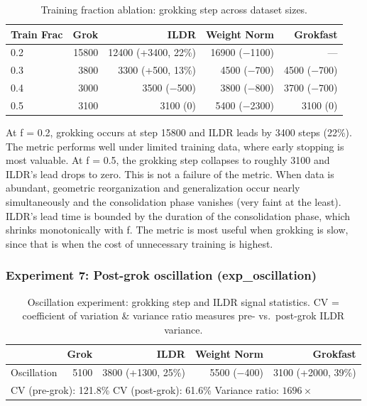 \documentclass{article}
\begin{document}
\begin{table}[H]
\centering
\begin{tabular}{lrrrr}
\hline
Train Frac & Grok & ILDR & Weight Norm & Grokfast \\
\hline
0.2 & 15800 & 12400 (+3400, 22\%) & 16900 ($-$1100)   & --- \\
0.3 & 3800  & 3300 (+500, 13\%)   & 4500 ($-$700)     & 4500 ($-$700) \\
0.4 & 3000  & 3500 ($-$500)       & 3800 ($-$800)     & 3700 ($-$700) \\
0.5 & 3100  & 3100 (0)            & 5400 ($-$2300)    & 3100 (0) \\
\hline
\end{tabular}
\caption{Training fraction ablation: grokking step across dataset sizes.}
\label{tab:trainfrac_ablation}
\end{table}


At f = 0.2, grokking occurs at step 15800 and ILDR leads by 3400 steps (22\%). The metric performs well under limited training data, where early stopping is most valuable. At f = 0.5, the grokking step collapses to roughly 3100 and ILDR's lead drops to zero. This is not a failure of the metric. When data is abundant, geometric reorganization and generalization occur nearly simultaneously and the consolidation phase vanishes (very faint at the least). ILDR's lead time is bounded by the duration of the consolidation phase, which shrinks monotonically with f. The metric is most useful when grokking is slow, since that is when the cost of unnecessary training is highest.




\subsubsection{Experiment 7: Post-grok oscillation (exp\_oscillation)}
\begin{table}[H]
\centering
\begin{tabular}{lrrrr}
\hline
 & Grok & ILDR & Weight Norm & Grokfast \\
\hline

Oscillation & 5100 & 3800 (+1300, 25\%) & 5500 ($-$400) & 3100 (+2000, 39\%) \\
\hline
\multicolumn{5}{l}{CV (pre-grok): 121.8\% \quad CV (post-grok): 61.6\% \quad Variance ratio: $1696\times$} \\
\hline
\end{tabular}
\caption{Oscillation experiment: grokking step and ILDR signal statistics.
         CV = coefficient of variation \& variance ratio measures pre- vs.\ post-grok ILDR variance.}
\label{tab:oscillation}
\end{table}
\end{document}
